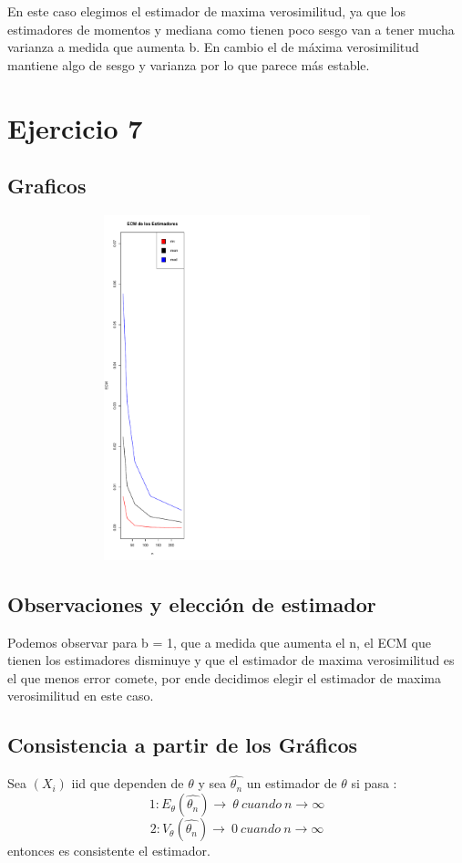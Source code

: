 \documentclass[a4paper]{article}
\begin{document}
En este caso elegimos el estimador de maxima verosimilitud, ya que los estimadores de momentos y mediana como tienen poco sesgo van a tener mucha varianza a medida que aumenta b. En cambio el de máxima verosimilitud mantiene algo de sesgo y varianza por lo que parece más estable.

\section{Ejercicio 7}
\subsection{Graficos}
\begin{figure}[H]
	\centering
	\includegraphics[width=15cm, height=10cm]{Ejercicio-7-plot}
\end{figure}

\subsection{Observaciones y elección de estimador}
Podemos observar para b = 1, que a medida que aumenta el n, el ECM  que tienen los estimadores disminuye y que el estimador de maxima verosimilitud es el que menos error comete, por ende decidimos elegir el estimador de maxima verosimilitud en este caso.   

\subsection{Consistencia a partir de los Gráficos}
Sea  $(X_{i}) $ iid que dependen de $\theta$ y sea $\hat{\theta_{n}}$ un estimador de $\theta$ si pasa : \newline
\[1: E_{\theta}{(\hat{\theta_{n}})} \rightarrow \ \theta \ cuando \ n \rightarrow \infty \] \newline
\[2: V_{\theta}{(\hat{\theta_{n}})} \rightarrow \ 0 \ cuando \ n \rightarrow \infty \] \newline
entonces es consistente el estimador. \newline
  
\end{document}
